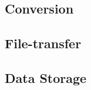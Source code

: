 \subsection{Conversion}

\FloatBarrier


\subsection{File-transfer}

\FloatBarrier

\subsection{Data Storage}

\FloatBarrier
